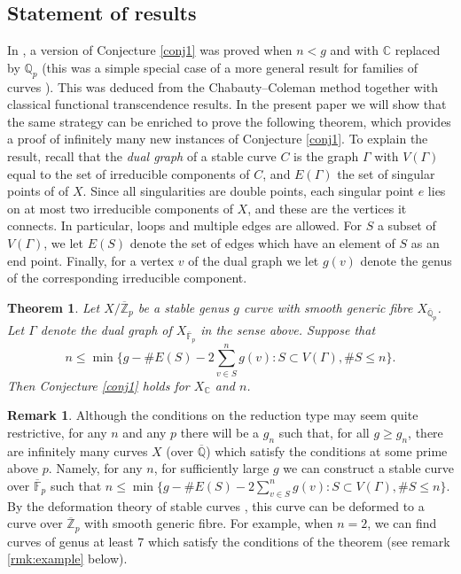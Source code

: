 \documentclass{amsart}
\def\Z{\mathbb Z}
\def\Q{\mathbb Q}
\theoremstyle{plain}
\newtheorem{theorem}{Theorem}
\theoremstyle{definition}
\newtheorem{remark}{Remark}
\newcommand{\F}{\mathbb{F}}
\begin{document}
\subsection{Statement of results}
In \cite[Proposition 1]{dogra}, a version of Conjecture \ref{conj1} was proved when $n<g$ and with $\mathbb{C}$ replaced by $\Q _p $ (this was a simple special case of a more general result for families of curves \cite[Theorem 1]{dogra}). This was deduced from the Chabauty--Coleman method together with classical functional transcendence results. In the present paper we will show that the same strategy can be enriched to prove the following theorem, which provides a proof of infinitely many new instances of Conjecture \ref{conj1}. To explain the result, recall that the \textit{dual graph} of a stable curve $C$ is the graph $\Gamma $ with $V(\Gamma )$ equal to the set of irreducible components of $C$, and $E(\Gamma )$ the set of singular points of of $X$. Since all singularities are double points, each singular point $e$ lies on at most two irreducible components of $X$, and these are the vertices it connects. In particular, loops and multiple edges are allowed. For $S$ a subset of $V(\Gamma )$, we let $E(S)$ denote the set of edges which have an element of $S$ as an end point. Finally, for a vertex $v$ of the dual graph we let $g(v)$ denote the genus of the corresponding irreducible component.
\begin{theorem}\label{thm:main1}
Let $X/\overline{\Z }_p $ be a stable genus $g$ curve with smooth generic fibre $X_{\overline{\Q }_p }$. Let $\Gamma $ denote the dual graph of $X_{\overline{\F }_p }$ in the sense above. Suppose that
\[
n\leq \min \{g-\# E(S)-2\sum _{v\in S}^n g(v ):S\subset V(\Gamma ), \# S\leq n \}.
\]
Then Conjecture \ref{conj1} holds for $X_{\mathbb{C}}$ and $n$.
\end{theorem}
\begin{remark}
Although the conditions on the reduction type may seem quite restrictive, for any $n$ and any $p$ there will be a $g_n$ such that, for all $g\geq g_n$, there are infinitely many curves $X$ (over $\overline{\Q }$) which satisfy the conditions at some prime above $p$. Namely, for any $n$, for sufficiently large $g$ we can construct a stable curve over $\overline{\F }_p $ such that $n\leq  \min \{g-\# E(S)-2\sum _{v\in S}^n g(v ):S\subset V(\Gamma ), \# S\leq n \}$. By the deformation theory of stable curves \cite[\S 3]{DM}, this curve can be deformed to a curve over $\overline{\Z }_p $ with smooth generic fibre. For example, when $n=2$, we can find curves of genus at least 7 which satisfy the conditions of the theorem (see remark \ref{rmk:example} below).
\end{remark}
\end{document}
